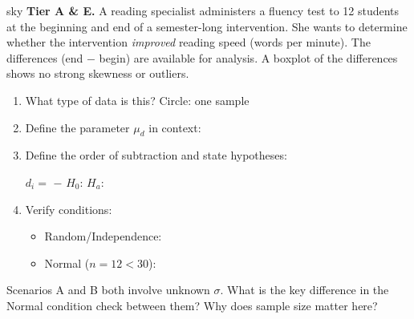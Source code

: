 \documentclass[10pt]{article}
\begin{document}
\begin{scenariobox}{sky}
\textbf{Tier A \& E.} \quad
A reading specialist administers a fluency test to 12 students at the beginning and end of a
semester-long intervention. She wants to determine whether the intervention \emph{improved}
reading speed (words per minute). The differences (end $-$ begin) are available for analysis.
A boxplot of the differences shows no strong skewness or outliers.

\begin{enumerate}[label=\alph*.]
  \item What type of data is this? Circle: \quad one sample \quad {}

  \item Define the parameter $\mu_d$ in context: 

  \item Define the order of subtraction and state hypotheses:

        $d_i = $  $-$  \qquad $H_0$:  \quad $H_a$: 

  \item Verify conditions:
        \begin{itemize}
          \item Random/Independence: 
          \item Normal ($n = 12 < 30$): 
        \end{itemize}
\end{enumerate}
\end{scenariobox}

\begin{reflectionbox}
Scenarios A and B both involve unknown $\sigma$. What is the key difference in the Normal
condition check between them? Why does sample size matter here?
\end{reflectionbox}
\end{document}
